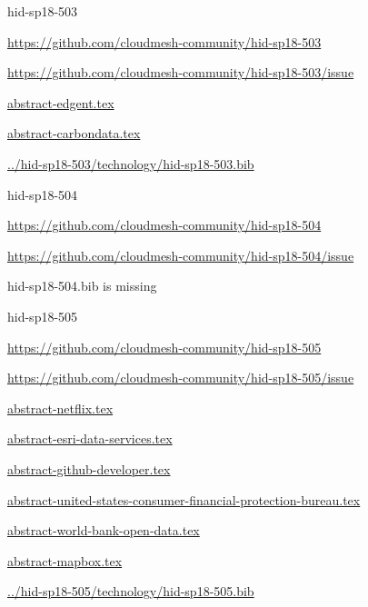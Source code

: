 \begin{IU}

hid-sp18-503

\url{https://github.com/cloudmesh-community/hid-sp18-503}

\url{https://github.com/cloudmesh-community/hid-sp18-503/issue}

\href{https://github.com/cloudmesh-community/hid-sp18-503/blob/master//technology/abstract-edgent.tex}{abstract-edgent.tex}

\href{https://github.com/cloudmesh-community/hid-sp18-503/blob/master//technology/abstract-carbondata.tex}{abstract-carbondata.tex}

\href{https://github.com/cloudmesh-community/hid-sp18-503/blob/master//technology/hid-sp18-503.bib}{../hid-sp18-503/technology/hid-sp18-503.bib}

\end{IU}


\begin{IU}

hid-sp18-504

\url{https://github.com/cloudmesh-community/hid-sp18-504}

\url{https://github.com/cloudmesh-community/hid-sp18-504/issue}

hid-sp18-504.bib is missing

\end{IU}


\begin{IU}

hid-sp18-505

\url{https://github.com/cloudmesh-community/hid-sp18-505}

\url{https://github.com/cloudmesh-community/hid-sp18-505/issue}

\href{https://github.com/cloudmesh-community/hid-sp18-505/blob/master//technology/abstract-netflix.tex}{abstract-netflix.tex}

\href{https://github.com/cloudmesh-community/hid-sp18-505/blob/master//technology/abstract-esri-data-services.tex}{abstract-esri-data-services.tex}

\href{https://github.com/cloudmesh-community/hid-sp18-505/blob/master//technology/abstract-github-developer.tex}{abstract-github-developer.tex}

\href{https://github.com/cloudmesh-community/hid-sp18-505/blob/master//technology/abstract-united-states-consumer-financial-protection-bureau.tex}{abstract-united-states-consumer-financial-protection-bureau.tex}

\href{https://github.com/cloudmesh-community/hid-sp18-505/blob/master//technology/abstract-world-bank-open-data.tex}{abstract-world-bank-open-data.tex}

\href{https://github.com/cloudmesh-community/hid-sp18-505/blob/master//technology/abstract-mapbox.tex}{abstract-mapbox.tex}

\href{https://github.com/cloudmesh-community/hid-sp18-505/blob/master//technology/hid-sp18-505.bib}{../hid-sp18-505/technology/hid-sp18-505.bib}

\end{IU}


